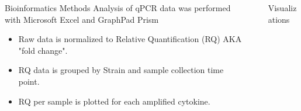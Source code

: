 \documentclass[final]{beamer}
\newlength{\sepwidth}
\newlength{\colwidth}
\newcommand{\separatorcolumn}{\begin{column}{\sepwidth}\end{column}}
\begin{document}
\begin{frame}[t]
\begin{columns}[t]
\begin{column}{\colwidth}
\begin{block}{Bioinformatics Methods}
    Analysis of qPCR data was performed with Microsoft Excel and GraphPad Prism
    \begin{itemize}
      \item {Raw data is normalized to Relative Quantification (RQ) AKA "fold change".}
      \item {RQ data is grouped by Strain and sample collection time point.}
      \item {RQ per sample is plotted for each amplified cytokine.}
    \end{itemize} 

  \end{block}

\end{column}

\separatorcolumn

\begin{column}{\colwidth}

  \begin{block}{Visualizations}


\end{block}
\end{column}
\end{columns}
\end{frame}
\end{document}
